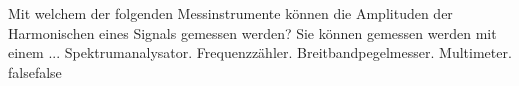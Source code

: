     {Mit welchem der folgenden Messinstrumente können die Amplituden der Harmonischen eines Signals gemessen werden? Sie können gemessen werden mit einem ...}
    {Spektrumanalysator.}
    {Frequenzzähler.}
    {Breitbandpegelmesser.}
    {Multimeter.}
    {false}{false}